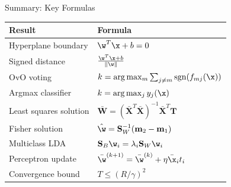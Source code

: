 \begin{frame}{Summary: Key Formulas}
  \renewcommand{\arraystretch}{1.5}
  \begin{center}
  \begin{tabular}{ll}
    \toprule
    \textbf{Result} & \textbf{Formula} \\
    \midrule
    Hyperplane boundary & $\w^T\x + b = 0$ \\
    Signed distance & $\frac{\w^T\x + b}{\|\w\|}$ \\
    OvO voting & $k = \arg\max_m \sum_{j \neq m}\mathrm{sgn}(f_{mj}(\x))$ \\
    Argmax classifier & $k = \arg\max_j y_j(\x)$ \\
    Least squares solution & $\bar{\mathbf{W}} = (\bar{\mathbf{X}}^T\bar{\mathbf{X}})^{-1}\bar{\mathbf{X}}^T\mathbf{T}$ \\
    Fisher solution & $\hat{\w} = \mathbf{S}_W^{-1}(\mathbf{m}_2 - \mathbf{m}_1)$ \\
    Multiclass LDA & $\mathbf{S}_B\w_i = \lambda_i\mathbf{S}_W\w_i$ \\
    Perceptron update & $\bar{\w}^{(k+1)} = \bar{\w}^{(k)} + \eta\bar{\x}_i t_i$ \\
    Convergence bound & $T \le (R/\gamma)^2$ \\
    \bottomrule
  \end{tabular}
  \end{center}
\end{frame}

